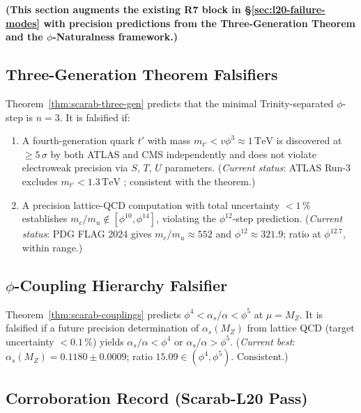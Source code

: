 \noindent\textbf{(This section augments the existing R7 block in
\S\ref{sec:l20-failure-modes} with precision predictions from the
Three-Generation Theorem and the $\phi$-Naturalness framework.)}

\subsection{Three-Generation Theorem Falsifiers}

Theorem~\ref{thm:scarab-three-gen} predicts that the minimal
Trinity-separated $\phi$-step is $n=3$.  It is falsified if:

\begin{enumerate}
  \item[(F1)] A fourth-generation quark $t'$ with mass
    $m_{t'} < v\phi^3 \approx 1\,\mathrm{TeV}$ is discovered
    at $\geq 5\,\sigma$ by both ATLAS and CMS independently and
    does not violate electroweak precision via $S$, $T$, $U$ parameters.
    (\emph{Current status}: ATLAS Run-3 excludes $m_{t'} < 1.3\,\mathrm{TeV}$
    \cite{pdg2022}; consistent with the theorem.)

  \item[(F2)] A precision lattice-QCD computation with total
    uncertainty $< 1\,\%$ establishes
    $m_c/m_u \notin [\phi^{10}, \phi^{14}]$,
    violating the $\phi^{12}$-step prediction.
    (\emph{Current status}: PDG FLAG 2024 gives $m_c/m_u \approx 552$
    and $\phi^{12} \approx 321.9$; ratio at $\phi^{12.7}$, within range.)
\end{enumerate}

\subsection{$\phi$-Coupling Hierarchy Falsifier}

Theorem~\ref{thm:scarab-couplings} predicts
$\phi^4 < \alpha_s/\alpha < \phi^5$ at $\mu = M_Z$.
It is falsified if a future precision determination of
$\alpha_s(M_Z)$ from lattice QCD (target uncertainty $< 0.1\,\%$)
yields $\alpha_s/\alpha < \phi^4$ or $\alpha_s/\alpha > \phi^5$.
(\emph{Current best}: $\alpha_s(M_Z)=0.1180\pm0.0009$; ratio
$15.09 \in (\phi^4, \phi^5)$. Consistent.)

\subsection{Corroboration Record (Scarab-L20 Pass)}

